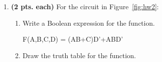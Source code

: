 \begin{enumerate}
\begin{enumerate}
	\item Draw a schematic of the logic circuit which realizes $F$ as
	shown, i.e. do not use Boolean Algebra on $F$.

\begin{solution}{
	\begin{figure}[ht]
	\end{figure}
}\end{solution}
\end{enumerate}


\item {\bf(2 pts. each)} For the circuit in Figure~\ref{fig:hw2}: 
\begin{enumerate}
	\item Write a Boolean expression for the function.

	\begin{solution}{ F(A,B,C,D) = (AB+C)D'+ABD'}\end{solution}
\item Draw the truth table for the function.



\end{enumerate}
\end{enumerate}

